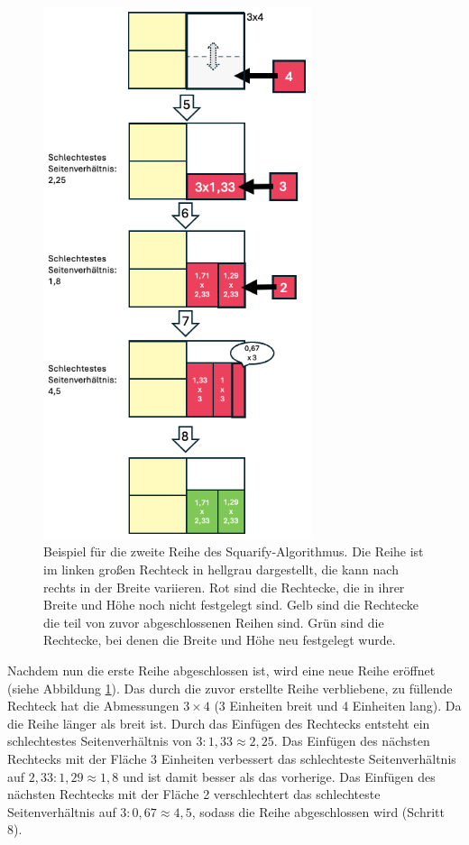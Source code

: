 \begin{figure}
    \centering
    \includegraphics[width=0.7\textwidth]{images/squarify_example_2.png}
    \caption{Beispiel für die zweite Reihe des Squarify-Algorithmus. Die Reihe ist im linken großen Rechteck in hellgrau dargestellt, die kann nach rechts in der Breite variieren. Rot sind die Rechtecke, die in ihrer Breite und Höhe noch nicht festgelegt sind. Gelb sind die Rechtecke die teil von zuvor abgeschlossenen Reihen sind. Grün sind die Rechtecke, bei denen die Breite und Höhe neu festgelegt wurde.}
    \label{fig:squarify_example_2}
\end{figure}

Nachdem nun die erste Reihe abgeschlossen ist, wird eine neue Reihe eröffnet (siehe Abbildung \ref{fig:squarify_example_2}). Das durch die zuvor erstellte Reihe verbliebene, zu füllende Rechteck hat die Abmessungen $3 \times 4$ (3 Einheiten breit und 4 Einheiten lang). Da die Reihe länger als breit ist. Durch das Einfügen des Rechtecks entsteht ein schlechtestes Seitenverhältnis von $3 : 1,33 \approx 2,25$. Das Einfügen des nächsten Rechtecks mit der Fläche 3 Einheiten verbessert das schlechteste Seitenverhältnis auf $2,33 : 1,29 \approx 1,8$ und ist damit besser als das vorherige. Das Einfügen des nächsten Rechtecks mit der Fläche 2 verschlechtert das schlechteste Seitenverhältnis auf $3 : 0,67 \approx 4,5$, sodass die Reihe abgeschlossen wird (Schritt 8).

